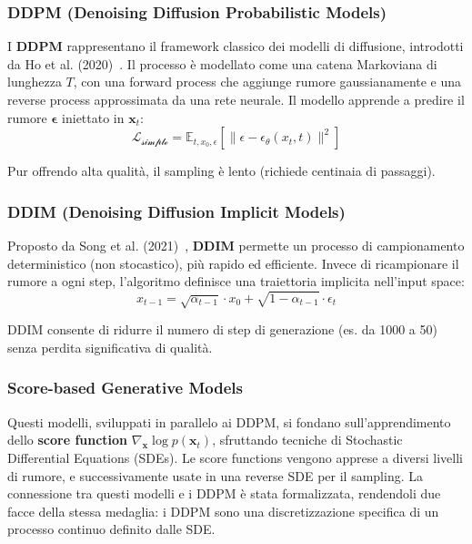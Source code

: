 \subsubsection*{DDPM (Denoising Diffusion Probabilistic Models)}

I \textbf{DDPM} rappresentano il framework classico dei modelli di diffusione, introdotti da Ho et al. (2020)~\cite{ho2020denoising}. Il processo è modellato come una catena Markoviana di lunghezza $T$, con una forward process che aggiunge rumore gaussianamente e una reverse process approssimata da una rete neurale. Il modello apprende a predire il rumore $\boldsymbol{\epsilon}$ iniettato in $\mathbf{x}_t$:
\begin{equation}
    \mathcal{L_{\operatorname{simple}}} = \mathbb{E}_{t,x_{0},\epsilon}[\|\epsilon - \epsilon_\theta(x_t,t)\|^2]
\end{equation}

Pur offrendo alta qualità, il sampling è lento (richiede centinaia di passaggi).

\subsubsection*{DDIM (Denoising Diffusion Implicit Models)}

Proposto da Song et al. (2021)~\cite{song2021score}, \textbf{DDIM} permette un processo di campionamento deterministico (non stocastico), più rapido ed efficiente. Invece di ricampionare il rumore a ogni step, l'algoritmo definisce una traiettoria implicita nell’input space:
\begin{equation}
    x_{t-1} = \sqrt{\alpha_{t-1}}\cdot x_0 + \sqrt{1-\alpha_{t-1}}\cdot\epsilon_t
\end{equation}

DDIM consente di ridurre il numero di step di generazione (es. da 1000 a 50) senza perdita significativa di qualità.

\subsubsection*{Score-based Generative Models}

Questi modelli, sviluppati in parallelo ai DDPM, si fondano sull’apprendimento dello \textbf{score function} $\nabla_{\mathbf{x}} \log p(\mathbf{x}_t)$, sfruttando tecniche di Stochastic Differential Equations (SDEs). Le score functions vengono apprese a diversi livelli di rumore, e successivamente usate in una reverse SDE per il sampling. La connessione tra questi modelli e i DDPM è stata formalizzata, rendendoli due facce della stessa medaglia: i DDPM sono una discretizzazione specifica di un processo continuo definito dalle SDE.

